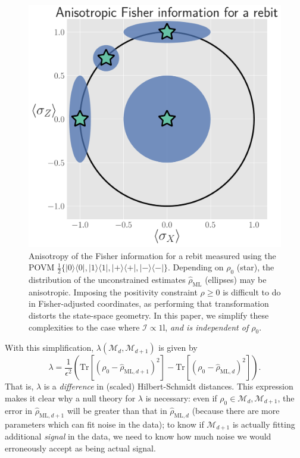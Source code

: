 \documentclass[aps,pra, twocolumn]{revtex4-1}
\newcommand{\M}{\mathcal{M}}
\newcommand{\Id}{\mathbb{I}}
\def\Id{1\!\mathrm{l}}
\newcommand{\rhohat}{\hat{\rho}}
\newcommand{\rhoML}[1]{\rhohat_{\scriptscriptstyle{\mathrm{ML},#1}}}
\begin{document}
\begin{figure}
\includegraphics[width=.85\columnwidth]{Images/Figure_2.pdf}
 \caption{Anisotropy of the Fisher information for a rebit measured using the POVM $\frac{1}{2}\{|0\rangle\langle 0|, |1\rangle\langle 1|, |+\rangle\langle +|, |-\rangle\langle -|\}$. Depending on $\rho_{0}$ (star), the distribution of the unconstrained estimates $\hat{\rho}_{\mathrm{ML}}$ (ellipses) may be anisotropic. Imposing the positivity constraint $\rho \geq 0$ is difficult to do in Fisher-adjusted coordinates, as performing that transformation distorts the state-space geometry. In this paper, we simplify these complexities to the case where $\mathcal{I} \propto \Id$, \emph{and is independent of $\rho_{0}$}.}
\label{fig:anisofi}
\end{figure}

With this simplification, $\lambda(\M_{d},\M_{d+1})$ is given by
\begin{equation}
\lambda = \frac{1}{\epsilon^{2}}\left(\mathrm{Tr}[(\rho_{0} - \rhoML{d+1})^{2}] -  \mathrm{Tr}[(\rho_{0} - \rhoML{d})^{2}]\right).
\end{equation}
That is, $\lambda$ is a \emph{difference} in (scaled) Hilbert-Schmidt distances. This expression makes it clear why a null theory for $\lambda$ is necessary: even if $\rho_{0} \in \M_{d},\M_{d+1}$, the error in $\rhoML{d+1}$ will be greater than that in $\rhoML{d}$ (because there are more parameters which can fit noise in the data); to know if $\M_{d+1}$ is actually fitting additional \emph{signal} in the data, we need to know how much noise we would erroneously accept as being actual signal.
\end{document}
